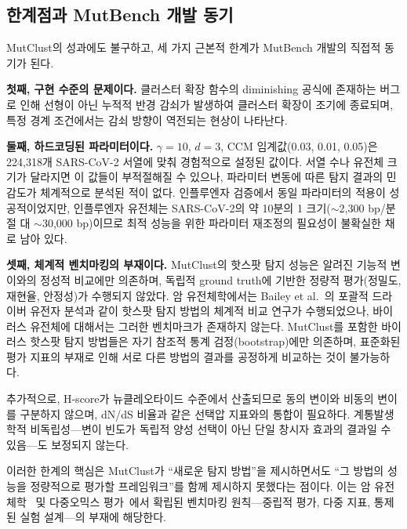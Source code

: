\subsection{한계점과 MutBench 개발 동기}
\label{subsec:mutclust_limitations}

MutClust의 성과에도 불구하고, 세 가지 근본적 한계가 MutBench 개발의 직접적 동기가 된다.

\textbf{첫째, 구현 수준의 문제이다.}
클러스터 확장 함수의 diminishing 공식에 존재하는 버그로 인해 선형이 아닌 누적적 반경 감쇠가 발생하여 클러스터 확장이 조기에 종료되며, 특정 경계 조건에서는 감쇠 방향이 역전되는 현상이 나타난다.

\textbf{둘째, 하드코딩된 파라미터이다.}
$\gamma=10$, $d=3$, CCM 임계값(0.03, 0.01, 0.05)은 224,318개 SARS-CoV-2 서열에 맞춰 경험적으로 설정된 값이다.
서열 수나 유전체 크기가 달라지면 이 값들이 부적절해질 수 있으나, 파라미터 변동에 따른 탐지 결과의 민감도가 체계적으로 분석된 적이 없다.
인플루엔자 검증에서 동일 파라미터의 적용이 성공적이었지만, 인플루엔자 유전체는 SARS-CoV-2의 약 10분의 1 크기($\sim$2,300 bp/분절 대 $\sim$30,000 bp)이므로 최적 성능을 위한 파라미터 재조정의 필요성이 불확실한 채로 남아 있다.

\textbf{셋째, 체계적 벤치마킹의 부재이다.}
MutClust의 핫스팟 탐지 성능은 알려진 기능적 변이와의 정성적 비교에만 의존하며, 독립적 ground truth에 기반한 정량적 평가(정밀도, 재현율, 안정성)가 수행되지 않았다.
암 유전체학에서는 Bailey et al.~\cite{bailey2018comprehensive}의 포괄적 드라이버 유전자 분석과 같이 핫스팟 탐지 방법의 체계적 비교 연구가 수행되었으나, 바이러스 유전체에 대해서는 그러한 벤치마크가 존재하지 않는다.
MutClust를 포함한 바이러스 핫스팟 탐지 방법들은 자기 참조적 통계 검정(bootstrap)에만 의존하며, 표준화된 평가 지표의 부재로 인해 서로 다른 방법의 결과를 공정하게 비교하는 것이 불가능하다.

추가적으로, H-score가 뉴클레오타이드 수준에서 산출되므로 동의 변이와 비동의 변이를 구분하지 않으며, dN/dS 비율과 같은 선택압 지표와의 통합이 필요하다.
계통발생학적 비독립성---변이 빈도가 독립적 양성 선택이 아닌 단일 창시자 효과의 결과일 수 있음---도 보정되지 않는다.

\vspace{1em}

이러한 한계의 핵심은 MutClust가 ``새로운 탐지 방법''을 제시하면서도 ``그 방법의 성능을 정량적으로 평가할 프레임워크''를 함께 제시하지 못했다는 점이다.
이는 암 유전체학~\cite{bailey2018comprehensive} 및 다중오믹스 평가~\cite{weber2019benchmarking}에서 확립된 벤치마킹 원칙---중립적 평가, 다중 지표, 통제된 실험 설계---의 부재에 해당한다.

